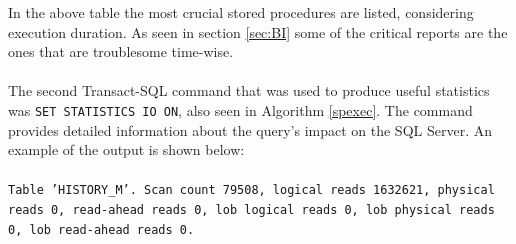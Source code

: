 \documentclass{cslthse-msc}
\begin{document}
In the above table the most crucial stored procedures are listed, considering execution duration. As seen in section \ref{sec:BI} some of the critical reports are the ones that are troublesome time-wise.\\\\
The second Transact-SQL command that was used to produce useful statistics was \texttt{SET STATISTICS IO ON}, also seen in Algorithm \ref{spexec}.  The command provides detailed information about the query's impact on the SQL Server. An example of the output is shown below:\\\\
\texttt{Table 'HISTORY\_M'. Scan count 79508, logical reads 1632621, physical reads 0, read-ahead reads 0, lob logical reads 0, lob physical reads 0, lob read-ahead reads 0.}\\\\
\end{document}
